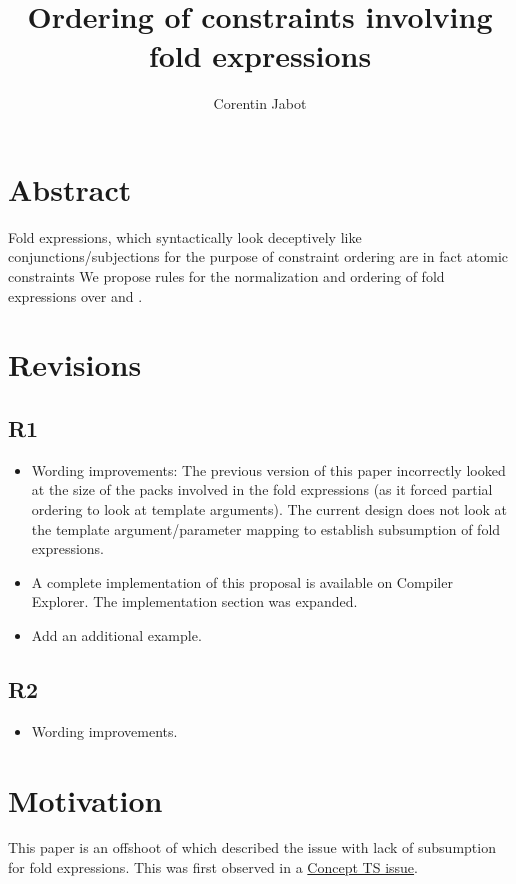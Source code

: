 \documentclass{wg21}
\title{Ordering of constraints involving fold expressions}
\author{Corentin Jabot}{corentin.jabot@gmail.com}
\begin{document}
\maketitle

\section{Abstract}

Fold expressions, which syntactically look deceptively like conjunctions/subjections for the purpose of constraint ordering are in fact atomic constraints
We propose rules for the normalization and ordering of fold expressions over \tcode{\&\&} and \tcode{||}.

\section{Revisions}

\subsection{R1}

\begin{itemize}
\item Wording improvements: The previous version of this paper incorrectly looked at the size of the packs involved in the fold expressions (as it forced partial ordering to look at template arguments).
The current design does not look at the template argument/parameter mapping to establish subsumption of fold expressions.
\item A complete implementation of this proposal is available on Compiler Explorer. The implementation section was expanded.
\item Add an additional example.
\end{itemize}

\subsection{R2}

\begin{itemize}
	\item Wording improvements.
\end{itemize}

\section{Motivation}

This paper is an offshoot of  which described the issue with lack of subsumption for fold expressions.
This was first observed in a \href{http://cplusplus.github.io/concepts-ts/ts-active.html#28}{Concept TS issue}.
\end{document}
